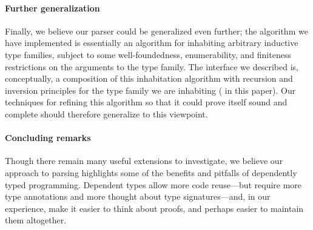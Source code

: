   \paragraph{Further generalization}
    Finally, we believe our parser could be generalized even further; the algorithm we have implemented is essentially an algorithm for inhabiting arbitrary inductive type families, subject to some well-foundedness, enumerability, and finiteness restrictions on the arguments to the type family.  The interface we described is, conceptually, a composition of this inhabitation algorithm with recursion and inversion principles for the type family we are inhabiting ( in this paper).  Our techniques for refining this algorithm so that it could prove itself sound and complete should therefore generalize to this viewpoint.

  \paragraph{Concluding remarks}
    Though there remain many useful extensions to investigate, we believe our approach to parsing highlights some of the benefits and pitfalls of dependently typed programming.  Dependent types allow more code reuse---but require more type annotations and more thought about type signatures---and, in our experience, make it easier to think about proofs, and perhaps easier to maintain them altogether.









